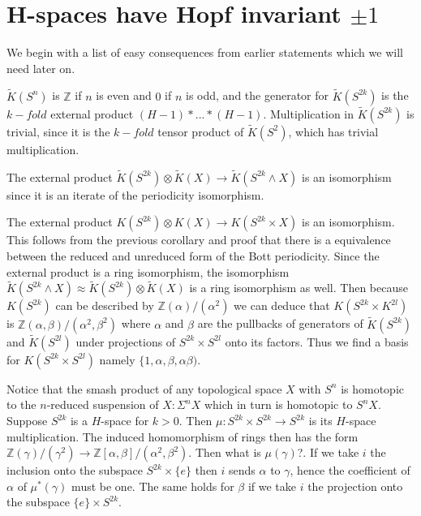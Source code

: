 \documentclass[../Thesis.tex]{subfiles}
\begin{document}
\section{H-spaces have Hopf invariant $\pm 1$}
We begin with a list of easy consequences from earlier statements which we will need later on.
\begin{Cor}
$\tilde{K}(S^n)$ is $\mathbb{Z}$ if $n$ is even and $0$ if $n$ is odd, and the generator for $\tilde{K}(S^{2k})$ is the $k-fold$ external product $(H-1) * ... * (H-1)$. Multiplication in $\tilde{K}(S^{2k})$ is trivial, since it is the $k-fold$ tensor product of $\tilde{K}(S^2)$, which has trivial multiplication.
\end{Cor}
\begin{Cor}
The external product $\tilde{K}(S^{2k}) \otimes \tilde{K}(X) \rightarrow \tilde{K}(S^{2k} \wedge  X)$ is an isomorphism since it is an iterate of the periodicity isomorphism. 
\end{Cor}
\begin{Cor}
The external product $K(S^{2k}) \otimes K(X) \rightarrow K(S^{2k} \times X)$ is an isomorphism. This follows from the previous corollary and proof that there is a equivalence between the reduced and unreduced form of the Bott periodicity. Since the external product is a ring isomorphism, the isomorphism $\tilde{K}(S^{2k} \wedge X) \approx \tilde{K}(S^{2k}) \otimes \tilde{K}(X)$ is a ring isomorphism as well. Then because $K(S^{2k})$ can be described by $\mathbb{Z}(\alpha)/(\alpha^2)$ we can deduce that $K(S^{2k} \times K^{2l})$ is $\mathbb{Z}(\alpha, \beta)/(\alpha^2, \beta^2)$ where $\alpha$ and $\beta$ are the pullbacks of generators of $\tilde{K}(S^{2k})$ and $\tilde{K}( S^{2l})$ under projections of $S^{2k} \times S^{2l}$ onto its factors. Thus we find a basis for $K(S^{2k} \times S^{2l})$ namely $\{ 1, \alpha, \beta, \alpha\beta)$.
\end{Cor}
Notice that the smash product of any topological space $X$ with $S^n$ is homotopic to the $n$-reduced suspension of $X: \Sigma^n X$ which in turn is homotopic to $S^n X$.
\\Suppose $S^{2k}$ is a $H$-space for $k > 0$. Then $\mu : S^{2k} \times S^{2k} \rightarrow S^{2k}$ is its $H$-space multiplication. The induced homomorphism of rings then has the form $\mathbb{Z}(\gamma)/(\gamma^2) \rightarrow \mathbb{Z}[\alpha, \beta]/(\alpha^2, \beta^2)$. Then what is $\mu(\gamma)$?. If we take $i$ the inclusion onto the subspace $S^{2k} \times \{ e \}$ then $i$ sends $\alpha$ to $\gamma$, hence the coefficient of $\alpha$ of $\mu^*(\gamma)$ must be one. The same holds for $\beta$ if we take $i$ the projection onto the subspace $\{e \} \times S^{2k}$.
\end{document}
